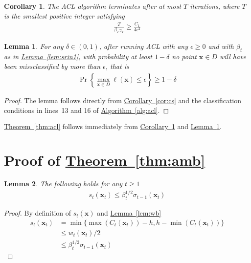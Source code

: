 \documentclass{article}
\def\*#1{\bm{#1}}
\newcommand{\algoref}[1]{\hyperref[#1]{\mbox{Algorithm~\ref*{#1}}}}
\newcommand{\theoremref}[1]{\hyperref[#1]{\mbox{Theorem~\ref*{#1}}}}
\newcommand{\lemmaref}[1]{\hyperref[#1]{\mbox{Lemma~\ref*{#1}}}}
\newcommand{\corref}[1]{\hyperref[#1]{\mbox{Corollary~\ref*{#1}}}}
\newtheorem{lemma}{Lemma}
\newtheorem{cor}{Corollary}
\newcommand{\acl}{\textsf{ACL}\xspace}
\begin{document}
\begin{cor}
\label{cor:iter}
The \acl algorithm terminates after at most $T$ iterations, where $T$
is the smallest positive integer satisfying
\begin{align*}
\frac{T}{\beta_T \gamma_T} \geq \frac{C_1}{4\epsilon^2}
\end{align*}
\end{cor}

\begin{lemma}
\label{lem:prob}
For any $\delta \in (0, 1)$, after running \acl with any $\epsilon \geq 0$
and with $\beta_t$ as in \lemmaref{lem:srin1}, with probability at least
$1-\delta$ no point $\*x \in D$ will have been missclassified by more
than $\epsilon$, that is
\begin{align*}
\Pr\left\{\max_{\*x\in D}\ell(\*x) \leq \epsilon\right\} \geq 1 - \delta
\end{align*}
\end{lemma}
\begin{proof}
The lemma follows directly from \corref{cor:cs} and the classification
conditions in lines~13 and 16 of \algoref{alg:acl}.
\end{proof}

\theoremref{thm:acl} follows immediately from \corref{cor:iter}
and \lemmaref{lem:prob}.

\section{Proof of \theoremref{thm:amb}} \label{sect:app_amb}
\begin{lemma}
\label{lem:sb}
The following holds for any $t \geq 1$
\begin{align*}
s_t(\*x_t) \leq \beta_t^{1/2}\sigma_{t-1}(\*x_t)
\end{align*}
\end{lemma}
\begin{proof}
By definition of $s_t(\*x)$ and \lemmaref{lem:wb}
\begin{align*}
s_t(\*x_t) &= \min\{\max(C_t(\*x_t))-h, h-\min(C_t(\*x_t))\}\\
&\leq w_t(\*x_t)/2\\
&\leq \beta_t^{1/2}\sigma_{t-1}(\*x_t)
\end{align*}
\end{proof}
\end{document}

